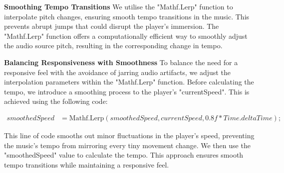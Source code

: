 \documentclass{l4proj}
\begin{document}
\textbf{Smoothing Tempo Transitions}\newline
We utilise the "Mathf.Lerp" function to interpolate pitch changes, ensuring smooth tempo transitions in the music. This prevents abrupt jumps that could disrupt the player's immersion. The "Mathf.Lerp" function offers a computationally efficient way to smoothly adjust the audio source pitch, resulting in the corresponding change in tempo.

\textbf{Balancing Responsiveness with Smoothness}\newline
To balance the need for a responsive feel with the avoidance of jarring audio artifacts, we adjust the interpolation parameters within the "Mathf.Lerp" function. Before calculating the tempo, we introduce a smoothing process to the player's "currentSpeed". This is achieved using the following code:

\begin{align*}
smoothedSpeed &= \text{Mathf.Lerp}(smoothedSpeed, currentSpeed, 0.8f * Time.deltaTime);
\end{align*}

This line of code smooths out minor fluctuations in the player's speed, preventing the music's tempo from mirroring every tiny movement change. We then use the "smoothedSpeed" value to calculate the tempo. This approach ensures smooth tempo transitions while maintaining a responsive feel.








\end{document}
